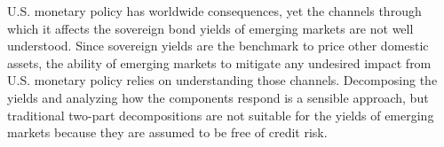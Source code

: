 U.S. monetary policy has worldwide consequences, yet the channels through which it affects the sovereign bond yields of emerging markets are not well understood. Since sovereign yields are the benchmark to price other domestic assets, the ability of emerging markets to mitigate any undesired impact from U.S. monetary policy relies on understanding those channels. 
Decomposing the yields and analyzing how the components respond is a sensible approach, but traditional two-part decompositions are not suitable for the %
yields of emerging markets because they are assumed to be free of credit risk.


